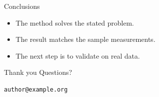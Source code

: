 \documentclass[aspectratio=169,14pt]{beamer}
\newcommand{\lblThanks}{Thank you}
\newcommand{\lblQuestions}{Questions?}
\begin{document}
  \begin{frame}{Conclusions}
    \begin{itemize}
      \item The method solves the stated problem.
      \item The result matches the sample measurements.
      \item The next step is to validate on real data.
    \end{itemize}
  \end{frame}

  \begin{frame}{\lblThanks}
    \centering
    \Large \lblQuestions
    \vspace{1em}

    \normalsize\texttt{author@example.org}
  \end{frame}
\end{document}
